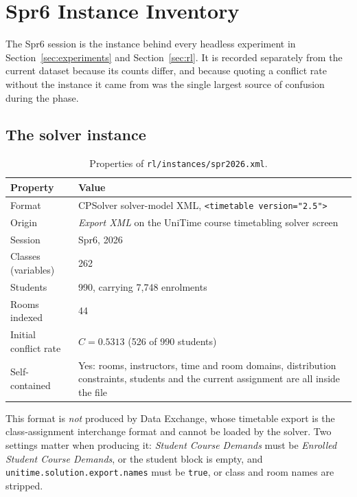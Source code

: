 \section{Spr6 Instance Inventory}
\label{app:spr6}

The Spr6 session is the instance behind every headless experiment in Section~\ref{sec:experiments}
and Section~\ref{sec:rl}. It is recorded separately from the current dataset because its counts
differ, and because quoting a conflict rate without the instance it came from was the single
largest source of confusion during the phase.

\subsection{The solver instance}

\begin{table}[H]
\centering
\caption{Properties of \texttt{rl/instances/spr2026.xml}.}
\label{tab:spr6inst}
\footnotesize
\begin{tabular}{@{}L{5.6cm}L{8.6cm}@{}}
\toprule
\textbf{Property} & \textbf{Value} \\
\midrule
Format            & CPSolver solver-model XML, \texttt{<timetable version="2.5">} \\
Origin            & \emph{Export XML} on the UniTime course timetabling solver screen \\
Session           & Spr6, 2026 \\
Classes (variables) & 262 \\
Students          & 990, carrying 7{,}748 enrolments \\
Rooms indexed     & 44 \\
Initial conflict rate & $C = 0.5313$ (526 of 990 students) \\
Self-contained    & Yes: rooms, instructors, time and room domains, distribution constraints,
                    students and the current assignment are all inside the file \\
\bottomrule
\end{tabular}
\end{table}

This format is \emph{not} produced by Data Exchange, whose timetable export is the class-assignment
interchange format and cannot be loaded by the solver. Two settings matter when producing it:
\emph{Student Course Demands} must be \emph{Enrolled Student Course Demands}, or the student block
is empty, and \texttt{unitime.solution.export.names} must be \texttt{true}, or class and room names
are stripped.

